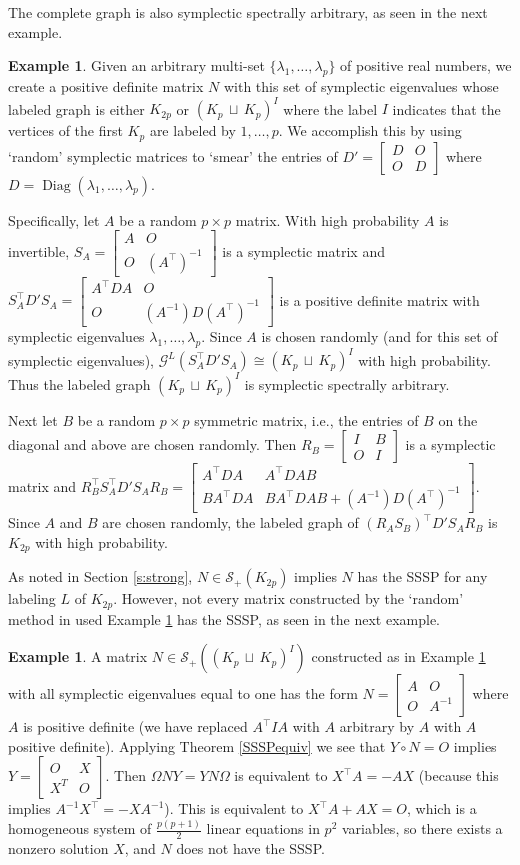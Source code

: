 \documentclass[12pt]{article}
\theoremstyle{definition}
\theoremstyle{definition}
\theoremstyle{definition}
\newtheorem{ex}[thm]{Example}
\numberwithin{figure}{section}
\numberwithin{equation}{section}
\newcommand{\GL}[1]{\mathcal{G} ^ #1}
\newcommand{\symp}{\mathcal{S}_+}
\newcommand{\trans}{^{\top}}
\newcommand{\mtx}[1]{\begin{bmatrix} #1 \end{bmatrix}}
\newcommand{\diag}{\operatorname{Diag}}
\newcommand{\x}{\times}
\newcommand{\lam}{\lambda}
\newcommand{\du}{\mathbin{\,\sqcup\,}}
\begin{document}
The complete graph is also symplectic spectrally arbitrary, as seen in the next example.

\begin{ex}\label{random}
Given an arbitrary multi-set $\{\lam_1,\dots,\lam_p\}$ of positive real numbers, we create a positive definite matrix $N$ with this set of symplectic eigenvalues
whose labeled graph is either $ K_{2p}$ or 
$(K_{p}\du K_p)^I$ where the label $I$ indicates that the vertices
of the first $K_p$ are labeled by $1, \ldots, p$.
We accomplish this by using `random' symplectic matrices to `smear' the entries of $D'=\mtx{D  & O\\ O&D}$ where $D=\diag(\lam_1,\dots,\lam_p)$. 

Specifically, let $A$ be a random 
 $p\x p$ matrix.  With high probability $A$ is invertible,   $S_A=\mtx{A & O\\O & (A^\top )^{-1}}$ is a symplectic matrix and $S_A^\top D'S_A=\mtx{A^\top D A & O\\ O & (A^{-1})D (A^\top )^{-1}}$ is 
 a positive definite matrix with symplectic eigenvalues $\lambda_1, \ldots, \lambda_p$.
Since $A$ is chosen randomly (and for this set of symplectic eigenvalues),     $\GL L(S_A^\top D'S_A)\cong (K_p\du K_p)^I$ with high probability.  Thus the labeled graph  $(K_p\du K_p)^I$  is symplectic spectrally arbitrary. 

Next let $B$ be a random $p\x p$ symmetric matrix, i.e., the entries of $B$ on the diagonal and above are chosen randomly. Then  $R_B=\mtx{I & B\\O & I}$ is a symplectic matrix and $R_B^\top S_A^\top D'S_AR_B=\mtx{A^\top D A & A^\top D AB\\B A\trans D A & BA^\top D AB+(A^{-1})D (A^\top )^{-1}}$. 
Since $A$ and $B$ are chosen randomly, 
the labeled graph of $(R_AS_B)^\top D'S_AR_B$ is $K_{2p}$ with high probability. 
\end{ex} 


As noted in Section \ref{s:strong},  $N\in\symp(K_{2p})$ implies $N$ has the SSSP for any labeling $L$ of $K_{2p}$.  
However, not every matrix constructed by 
 the `random' method in {used} Example \ref{random} has the SSSP, as seen in the next  example.
 
\begin{ex}\label{random-notSSSP}
    A matrix $N\in\symp((K_p\du K_p)^I)$  constructed as in Example \ref{random} with all symplectic eigenvalues equal to one has the form $N=\mtx{A & O\\O & A^{-1}}$ where $A$ is positive definite (we have replaced $A\trans IA$ with $A$ arbitrary by $A$ with $A$ positive definite).  Applying Theorem \ref{SSSPequiv} we see that $Y\circ N=O$ implies $Y=\mtx{O & X\\X^T & O}$. Then $\Omega NY=Y N \Omega$ is  equivalent to $X\trans A=-AX$ (because this implies  $A^{-1}X\trans=-XA^{-1}$). This is equivalent to $X\trans A+AX=O$, which is a homogeneous system of  
    $\frac{p(p+1)}2$ linear equations in  $p^2$ variables, so {there exists} a nonzero solution $X$, 
    {and $N$ does not have the SSSP}. 
\end{ex}
\end{document}
